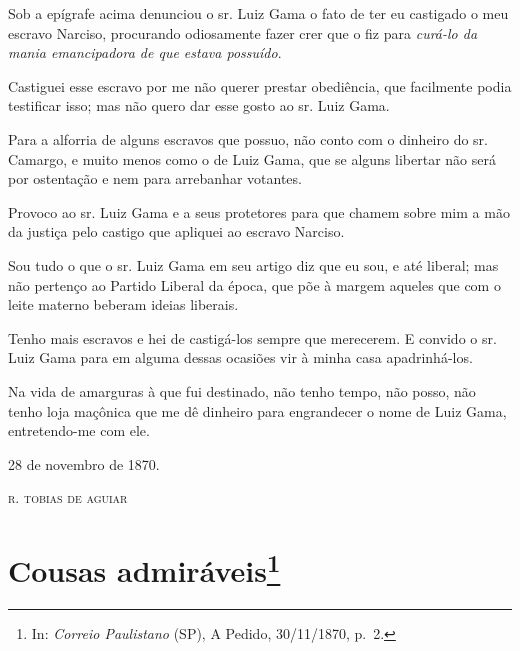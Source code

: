 {\asterisc{}

Sob a epígrafe acima denunciou o sr. Luiz Gama o fato de ter eu
castigado o meu escravo Narciso, procurando odiosamente fazer crer que o
fiz para \emph{curá-lo da mania emancipadora de que estava possuído}.

Castiguei esse escravo por me não querer prestar obediência, que
facilmente podia testificar isso; mas não quero dar esse gosto ao sr.
Luiz Gama.

Para a alforria de alguns escravos que possuo, não conto com o dinheiro
do sr. Camargo, e muito menos como o de Luiz Gama, que se alguns
libertar não será por ostentação e nem para arrebanhar votantes.

Provoco ao sr. Luiz Gama e a seus protetores para que chamem sobre mim a
mão da justiça pelo castigo que apliquei ao escravo Narciso.

Sou tudo o que o sr. Luiz Gama em seu artigo diz que eu sou, e até
liberal; mas não pertenço ao Partido Liberal da época, que põe à margem
aqueles que com o leite materno beberam ideias liberais.

Tenho mais escravos e hei de castigá-los sempre que merecerem. E convido
o sr. Luiz Gama para em alguma dessas ocasiões vir à minha casa
apadrinhá-los.

Na vida de amarguras à que fui destinado, não tenho tempo, não posso,
não tenho loja maçônica que me dê dinheiro para engrandecer o nome de
Luiz Gama, entretendo-me com ele.
\begin{flushright}
28 de novembro de 1870.

\textsc{r. tobias de aguiar}
\end{flushright}

\chapter{Cousas admiráveis\footnote{ In: \emph{Correio Paulistano} (SP), A Pedido, 30/11/1870,
  p.~2.}} %

}
